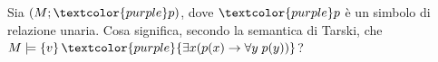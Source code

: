 \begin{example}
    Sia $(M;\textcolor{purple}p)$, dove $\textcolor{purple}p$ è un simbolo di relazione unaria. Cosa significa, secondo la semantica di Tarski, che $M \models \{v\}\,\textcolor{purple}{\exists x(p(x) \to \forall y \; p(y))}$?
\end{example}